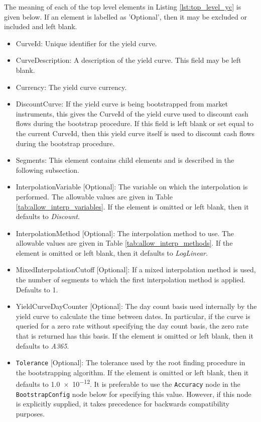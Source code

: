 The meaning of each of the top level elements in Listing \ref{lst:top_level_yc} is given below. If an element is labelled 
as 'Optional', then it may be excluded or included and left blank.
\begin{itemize}
\item CurveId: Unique identifier for the yield curve.
\item CurveDescription: A description of the yield curve. This field may be left blank.
\item Currency: The yield curve currency.
\item DiscountCurve: If the yield curve is being bootstrapped from market instruments, this gives the CurveId of the
yield curve used to discount cash flows during the bootstrap procedure. If this field is left blank or set equal to the
current CurveId, then this yield curve itself is used to discount cash flows during the bootstrap procedure.
\item Segments: This element contains child elements and is described in the following subsection.
\item InterpolationVariable [Optional]: The variable on which the interpolation is performed. The allowable values are
given in Table \ref{tab:allow_interp_variables}. If the element is omitted or left blank, then it defaults to
\emph{Discount}.
\item InterpolationMethod [Optional]: The interpolation method to use. The allowable values are given in Table
\ref{tab:allow_interp_methods}. If the element is omitted or left blank, then it defaults to \emph{LogLinear}.
\item MixedInterpolationCutoff [Optional]: If a mixed interpolation method is used, the number of segments to which the
  first interpolation method is applied. Defaults to 1.
\item YieldCurveDayCounter [Optional]: The day count basis used internally by the yield curve to calculate the time between
dates. In particular, if the curve is queried for a zero rate without specifying the day count basis, the zero rate that
is returned has this basis. If the element is omitted or left blank, then it defaults to \emph{A365}.

\item \lstinline!Tolerance! [Optional]: The tolerance used by the root finding procedure in the bootstrapping algorithm. If the
element is omitted or left blank, then it defaults to \num[scientific-notation=true]{1.0e-12}. It is preferable to use the 
\lstinline!Accuracy! node in the \lstinline!BootstrapConfig! node below for specifying this value. However, if this node is 
explicitly supplied, it takes precedence for backwards compatibility purposes.


\end{itemize}
